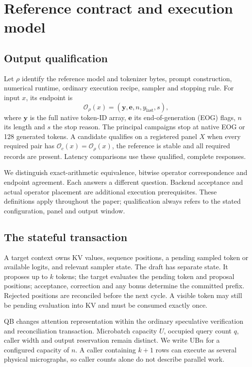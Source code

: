 \section{Reference contract and execution model}
\label{sec:contract}
\subsection{Output qualification}
Let $\rho$ identify the reference model and tokenizer bytes, prompt construction, numerical runtime, ordinary execution recipe, sampler and stopping rule. For input $x$, its endpoint is
\begin{equation}
\mathcal O_\rho(x)=(\mathbf y,\mathbf e,n,y_{\mathrm{last}},s),
\label{eq:endpoint}
\end{equation}
where $\mathbf y$ is the full native token-ID array, $\mathbf e$ its end-of-generation (EOG) flags, $n$ its length and $s$ the stop reason. The principal campaigns stop at native EOG or 128 generated tokens. A candidate qualifies on a registered panel $X$ when every required pair has $\mathcal O_c(x)=\mathcal O_\rho(x)$, the reference is stable and all required records are present. Latency comparisons use these qualified, complete responses.

We distinguish exact-arithmetic equivalence, bitwise operator correspondence and endpoint agreement. Each answers a different question. Backend acceptance and actual operator placement are additional execution prerequisites. These definitions apply throughout the paper; qualification always refers to the stated configuration, panel and output window.

\subsection{The stateful transaction}
A target context owns KV values, sequence positions, a pending sampled token or available logits, and relevant sampler state. The draft has separate state. It proposes up to $k$ tokens; the target evaluates the pending token and proposal positions; acceptance, correction and any bonus determine the committed prefix. Rejected positions are reconciled before the next cycle. A visible token may still be pending evaluation into KV and must be consumed exactly once.

QB changes attention representation within the ordinary speculative verification and reconciliation transaction. Microbatch capacity $U$, occupied query count $q$, caller width and output reservation remain distinct. We write UB$n$ for a configured capacity of $n$. A caller containing $k+1$ rows can execute as several physical micrographs, so caller counts alone do not describe parallel work.

